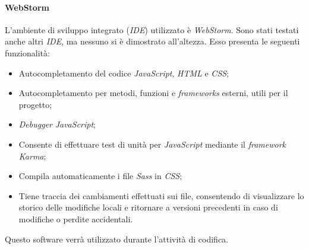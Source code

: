 \paragraph{WebStorm}
L'ambiente di sviluppo integrato (\textit{IDE}) utilizzato è \textit{WebStorm}. Sono stati testati anche altri \textit{IDE}, ma nessuno si è dimostrato all'altezza. Esso presenta le seguenti funzionalità:
\begin{itemize}
\item
Autocompletamento del codice \textit{JavaScript}, \textit{HTML} e \textit{CSS};
\item
Autocompletamento per metodi, funzioni e \textit{frameworks} esterni, utili per il progetto;
\item
\textit{Debugger} \textit{JavaScript};
\item
Consente di effettuare test di unità per \textit{JavaScript} mediante il \textit{framework} \textit{Karma};
\item
Compila automaticamente i file \textit{Sass} in \textit{CSS};
\item
Tiene traccia dei cambiamenti effettuati sui file, consentendo di visualizzare lo storico delle modifiche locali e ritornare a versioni precedenti in caso di modifiche o perdite accidentali.
\end{itemize}
Questo software verrà utilizzato durante l'attività di codifica.
